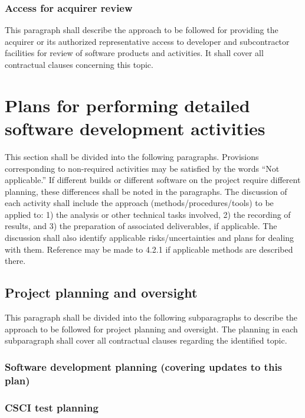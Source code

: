 \documentclass{fidata-report-template}
\begin{document}
\subsubsection{Access for acquirer review}

This paragraph shall describe the approach to be followed for providing
the acquirer or its authorized representative access to developer and
subcontractor facilities for review of software products and activities.
It shall cover all contractual clauses concerning this topic.

\section{Plans for performing detailed software development
activities}

This section shall be divided into the following paragraphs. Provisions
corresponding to non-required activities may be satisfied by the words
``Not applicable.'' If different builds or different software on the
project require different planning, these differences shall be noted in
the paragraphs. The discussion of each activity shall include the
approach (methods/procedures/tools) to be applied to: 1) the analysis
or other technical tasks involved, 2) the recording of results, and 3)
the preparation of associated deliverables, if applicable. The
discussion shall also identify applicable risks/uncertainties and plans
for dealing with them. Reference may be made to 4.2.1 if applicable
methods are described there.

\subsection{Project planning and oversight}

This paragraph shall be divided into the following subparagraphs to
describe the approach to be followed for project planning and oversight.
The planning in each subparagraph shall cover all contractual clauses
regarding the identified topic.

\subsubsection{Software development planning (covering updates to this
plan)}

\subsubsection{CSCI test planning}
\end{document}
